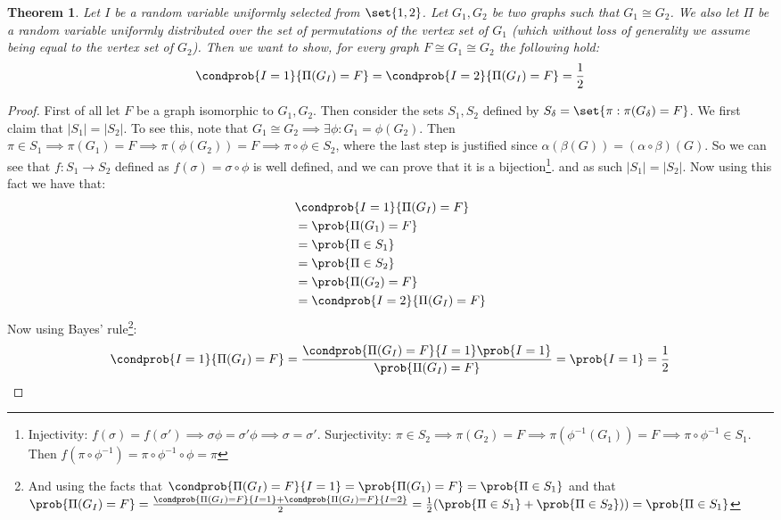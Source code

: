 \documentclass{article}
\newtheorem{theorem}{Theorem}
\begin{document}
\begin{theorem}
    Let $I$ be a random variable uniformly selected from $\set{1, 2}$. Let $G_1, G_2$ be two graphs such that $G_1 \cong G_2$. We also let $\Pi$ be a random variable uniformly distributed over the set of permutations of the vertex set of $G_1$ (which without loss of generality we assume being equal to the vertex set of $G_2$). Then we want to show, for every graph $F \cong G_1 \cong G_2$ the following hold:
    \[ \condprob{I = 1}{\Pi(G_I) = F} = \condprob{I = 2}{\Pi(G_I) = F} = \frac{1}{2} \]
\end{theorem}
\begin{proof}
    First of all let $F$ be a graph isomorphic to $G_1, G_2$.
    Then consider the sets $S_1, S_2$ defined by $S_\delta = \set{ \pi : \pi(G_\delta) = F }$. We first claim that $|S_1| = |S_2|$. To see this, note that $G_1 \cong G_2 \implies \exists \phi : G_1 = \phi(G_2) $. Then $\pi \in S_1 \implies \pi(G_1) = F \implies \pi(\phi(G_2)) = F \implies \pi \circ \phi \in S_2$, where the last step is justified since $\alpha(\beta(G)) = (\alpha \circ \beta) (G)$. So we can see that $f: S_1 \to S_2$ defined as $f(\sigma) = \sigma \circ \phi$ is well defined, and we can prove that it is a bijection\footnote{Injectivity: $f(\sigma) = f(\sigma') \implies \sigma \phi = \sigma' \phi \implies \sigma = \sigma'$. Surjectivity: $\pi \in S_2 \implies \pi(G_2) = F \implies \pi (\phi ^ {-1} (G_1)) = F \implies \pi \circ \phi^{-1} \in S_1$. Then $f(\pi \circ \phi^{-1}) = \pi \circ \phi^{-1} \circ \phi = \pi$}. and as such $|S_1| = |S_2|$. Now using this fact we have that:
    \begin{align*}
         & \condprob{I = 1}{\Pi(G_I) = F}   \\
         & = \prob{\Pi(G_1) = F }           \\
         & = \prob{\Pi \in S_1}             \\
         & = \prob{\Pi \in S_2}             \\
         & = \prob{\Pi(G_2) = F }           \\
         & = \condprob{I = 2}{\Pi(G_I) = F}
    \end{align*}
    Now using Bayes' rule\footnote{And using the facts that $ \condprob{\Pi(G_I) = F}{I = 1} = \prob{\Pi(G_1) = F} = \prob{\Pi \in S_1}$ and that
        $\prob{\Pi(G_I) = F} = \frac{\condprob{\Pi(G_I) = F }{I = 1} + \condprob{\Pi(G_I) = F}{I = 2}}{2} = \frac{1}{2}(\prob{\Pi \in S_1} + \prob{\Pi \in S_2})) = \prob{\Pi \in S_1}$}:
    \[ \condprob{I = 1}{\Pi(G_I) = F} = \frac{\condprob{\Pi(G_I) = F}{I = 1} \prob{I = 1}}{\prob{\Pi(G_I) = F}}  = \prob{I = 1} = \frac{1}{2}\]

\end{proof}
\end{document}
